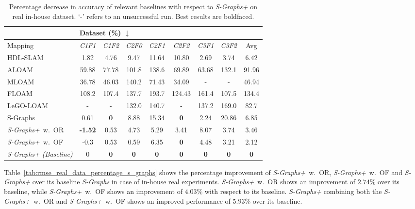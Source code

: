 \begin{table}[!htp]
\setlength{\tabcolsep}{3pt}
\caption{Percentage decrease in accuracy of relevant baselines with respect to \textit{S-Graphs+} on real in-house dataset. `-' refers to an unsuccessful run. Best results are boldfaced.}
\scriptsize
\centering
\begin{tabular}{l | c c c c c c c | c}
\toprule
& \multicolumn{3}{l}{\textbf{Dataset} (\%) $\boldsymbol{\downarrow}$} \\
\toprule
 {Mapping}  & \textit{C1F1} &  \textit{C1F2}  & \textit{C2F0} & \textit{C2F1} & \textit{C2F2} & \textit{C3F1} & \textit{C3F2} & Avg \\ 
\midrule
HDL-SLAM \cite{hdl_graph_slam} & 1.82 & 4.76  & 9.47 & 11.64 & 10.80 & 2.69 & 3.74 & 6.42 \\ 
ALOAM \cite{loam} & 59.88 & 77.78 & 101.8  & 138.6 & 69.89 & 63.68 & 132.1 & 91.96 \\ 
MLOAM \cite{mloam} & 36.78 &  46.03 & 140.2 & 71.43 & 34.09  & - & - &  46.94 \\ 
FLOAM \cite{floam}  & 108.2 & 107.4 & 137.7 & 193.7 & 124.43 & 161.4 & 107.5 & 134.4   \\
LeGO-LOAM \cite{lego-loam}  & - & - & 132.0 &  140.7 & - & 137.2 &  169.0 & 82.7 \\
{S-Graphs} \cite{s_graphs} & 0.61 & \textbf{0} & 8.88 & 15.34 & \textbf{0}  & {2.24} &  20.86 & 6.85 \\ 
\midrule
\mbox{\textit{S-Graphs+} w. OR}  & \textbf{-1.52} & {0.53} & 4.73 & {5.29} & 3.41 & 8.07 & 3.74 & 3.46 \\ 
\mbox{\textit{S-Graphs+} w. OF} & -0.3 & 0.53 & {0.59} & 6.35 & \textbf{0} & 4.48 & {3.21} & {2.12}  \\ 
\midrule
\textit{S-Graphs+ (Baseline)} & 0 & \textbf{0}  & \textbf{0} & \textbf{0} & \textbf{0}  & \textbf{0} & \textbf{0} & \textbf{0} \\ 
\bottomrule 
\end{tabular}
\label{tab:rmse_real_data_percentage_all}
\end{table}


Table~\ref{tab:rmse_real_data_percentage_s_graphs} shows the percentage improvement of \mbox{\textit{S-Graphs+} w. OR}, \mbox{\textit{S-Graphs+} w. OF} and \textit{S-Graphs+} over its baseline \textit{S-Graphs} in case of in-house real experiments. \mbox{\textit{S-Graphs+} w. OR} shows an improvement of $2.74\%$ over its baseline, while \mbox{\textit{S-Graphs+} w. OF} shows an improvement of $4.03\%$ with respect to its baseline. \textit{S-Graphs+} combining both the \mbox{\textit{S-Graphs+} w. OR} and \mbox{\textit{S-Graphs+} w. OF} shows an improved performance of $5.93\%$ over its baseline. 

